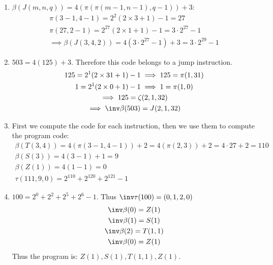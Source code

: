 \begin{enumerate}[label=\ilabel]
    \item
        $\beta(J(m, n, q)) = 4(\pi(\pi(m-1, n-1), q-1)) + 3$:
        \begin{gather*}
            \pi(3-1, 4 -1)= 2^2(2\times3+1) - 1 = 27 \\
            \pi(27, 2 - 1) = 2^{27}(2 \times 1 + 1) - 1 = 3 \cdot 2^{27} - 1 \\
            \implies \beta(J(3, 4, 2)) = 4(3 \cdot 2^{27} - 1) + 3 = 3 \cdot 2^{29} - 1
        \end{gather*}
    \item
        $503 = 4(125) + 3$. Therefore this code belongs to a jump instruction.
        \begin{gather*}
            125 = 2^1(2 \times 31 + 1) - 1 \implies 125 = \pi(1, 31) \\
            1 = 2^1(2 \times 0 + 1) - 1 \implies 1 = \pi(1, 0) \\
            \implies 125 = \zeta(2, 1, 32)\\
            \implies \inv \beta(503) = J(2, 1, 32)
        \end{gather*}
    \item 
        First we compute the code for each instruction, then we use them to compute the program code:
        \begin{gather*}
            \beta(T(3, 4)) = 4(\pi(3 -1, 4 -1)) + 2 = 4(\pi(2, 3)) + 2 = 4 \cdot 27 + 2 = 110 \\
            \beta(S(3)) = 4(3-1) + 1 = 9 \\
            \beta(Z(1)) = 4(1 - 1) = 0 \\
            \tau(111, 9, 0) = 2^{110} + 2^{120} + 2^{121} - 1
        \end{gather*}
    \item 
        $100 = 2^0 + 2^2 + 2^5 + 2^6 - 1$. Thus $\inv \tau(100) = (0, 1, 2, 0)$
        \begin{gather*}
            \inv \beta(0) = Z(1)\\
            \inv \beta(1) = S(1) \\
            \inv \beta(2) = T(1, 1) \\
            \inv \beta(0) = Z(1)
        \end{gather*}
        Thus the program is: $Z(1), S(1),  T(1, 1),  Z(1)$.
\end{enumerate}